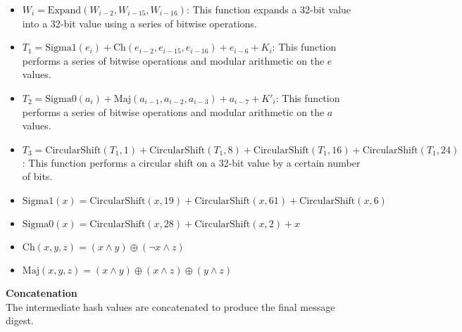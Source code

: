 \documentclass[11pt]{article}
\begin{document}
\begin{itemize}
\item $W_i = \text{Expand}(W_{i-2}, W_{i-15}, W_{i-16})$: This function expands a 32-bit value into a 32-bit value using a series of bitwise operations.
\item $T_1 = \text{Sigma1}(e_i) + \text{Ch}(e_{i-2}, e_{i-15}, e_{i-16}) + e_{i-6} + K_i$: This function performs a series of bitwise operations and modular arithmetic on the $e$ values.
\item $T_2 = \text{Sigma0}(a_i) + \text{Maj}(a_{i-1}, a_{i-2}, a_{i-3}) + a_{i-7} + K'_i$: This function performs a series of bitwise operations and modular arithmetic on the $a$ values.
\item $T_3 = \text{CircularShift}(T_1, 1) + \text{CircularShift}(T_1, 8) + \text{CircularShift}(T_1, 16) + \text{CircularShift}(T_1, 24)$: This function performs a circular shift on a 32-bit value by a certain number of bits.
\item $\text{Sigma1}(x) = \text{CircularShift}(x, 19) + \text{CircularShift}(x, 61) + \text{CircularShift}(x, 6)$
\item $\text{Sigma0}(x) = \text{CircularShift}(x, 28) + \text{CircularShift}(x, 2) + x$
\item $\text{Ch}(x, y, z) = (x \wedge y) \oplus (\neg x \wedge z)$
\item $\text{Maj}(x, y, z) = (x \wedge y) \oplus (x \wedge z) \oplus (y \wedge z)$
\end{itemize}
\textbf{Concatenation}\\
The intermediate hash values are concatenated to produce the final message digest.
\end{document}
